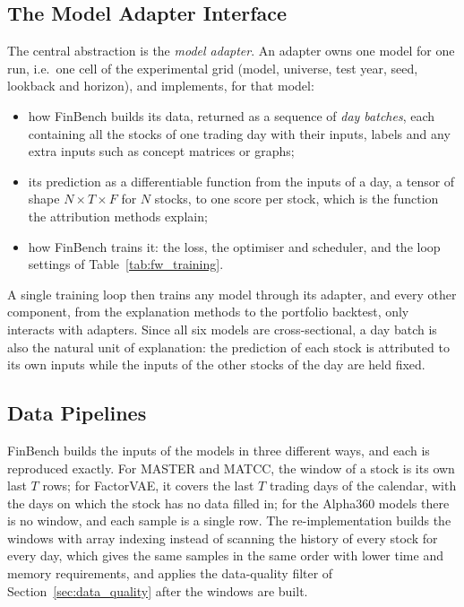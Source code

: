 \subsection{The Model Adapter Interface}

The central abstraction is the \emph{model adapter}. An adapter owns one model for one run, i.e.\ one cell of the experimental grid (model, universe, test year, seed, lookback and horizon), and implements, for that model:
\begin{itemize}[noitemsep]
    \item how FinBench builds its data, returned as a sequence of \emph{day batches}, each containing all the stocks of one trading day with their inputs, labels and any extra inputs such as concept matrices or graphs;
    \item its prediction as a differentiable function from the inputs of a day, a tensor of shape $N \times T \times F$ for $N$ stocks, to one score per stock, which is the function the attribution methods explain;
    \item how FinBench trains it: the loss, the optimiser and scheduler, and the loop settings of Table~\ref{tab:fw_training}.
\end{itemize}
A single training loop then trains any model through its adapter, and every other component, from the explanation methods to the portfolio backtest, only interacts with adapters. Since all six models are cross-sectional, a day batch is also the natural unit of explanation: the prediction of each stock is attributed to its own inputs while the inputs of the other stocks of the day are held fixed.

\subsection{Data Pipelines}

FinBench builds the inputs of the models in three different ways, and each is reproduced exactly. For MASTER and MATCC, the window of a stock is its own last $T$ rows; for FactorVAE, it covers the last $T$ trading days of the calendar, with the days on which the stock has no data filled in; for the Alpha360 models there is no window, and each sample is a single row. The re-implementation builds the windows with array indexing instead of scanning the history of every stock for every day, which gives the same samples in the same order with lower time and memory requirements, and applies the data-quality filter of Section~\ref{sec:data_quality} after the windows are built.

